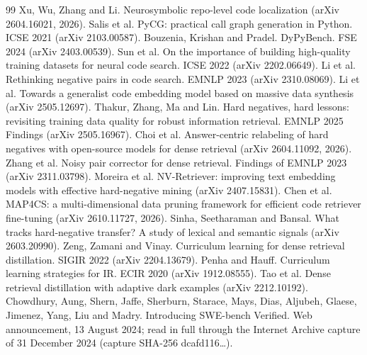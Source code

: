 \documentclass[10pt,twocolumn]{article}
\begin{document}
\begin{thebibliography}{99}
Xu, Wu, Zhang and Li. Neurosymbolic repo-level code localization (arXiv 2604.16021, 2026).
Salis et al. PyCG: practical call graph generation in Python. ICSE 2021 (arXiv 2103.00587).
Bouzenia, Krishan and Pradel. DyPyBench. FSE 2024 (arXiv 2403.00539).
Sun et al. On the importance of building high-quality training datasets for neural code search. ICSE 2022 (arXiv 2202.06649).
Li et al. Rethinking negative pairs in code search. EMNLP 2023 (arXiv 2310.08069).
Li et al. Towards a generalist code embedding model based on massive data synthesis (arXiv 2505.12697).
Thakur, Zhang, Ma and Lin. Hard negatives, hard lessons: revisiting training data quality for robust information retrieval. EMNLP 2025 Findings (arXiv 2505.16967).
Choi et al. Answer-centric relabeling of hard negatives with open-source models for dense retrieval (arXiv 2604.11092, 2026).
Zhang et al. Noisy pair corrector for dense retrieval. Findings of EMNLP 2023 (arXiv 2311.03798).
Moreira et al. NV-Retriever: improving text embedding models with effective hard-negative mining (arXiv 2407.15831).
Chen et al. MAP4CS: a multi-dimensional data pruning framework for efficient code retriever fine-tuning (arXiv 2610.11727, 2026).
Sinha, Seetharaman and Bansal. What tracks hard-negative transfer? A study of lexical and semantic signals (arXiv 2603.20990).
Zeng, Zamani and Vinay. Curriculum learning for dense retrieval distillation. SIGIR 2022 (arXiv 2204.13679).
Penha and Hauff. Curriculum learning strategies for IR. ECIR 2020 (arXiv 1912.08555).
Tao et al. Dense retrieval distillation with adaptive dark examples (arXiv 2212.10192).
Chowdhury, Aung, Shern, Jaffe, Sherburn, Starace, Mays, Dias, Aljubeh, Glaese, Jimenez, Yang, Liu and Madry. Introducing SWE-bench Verified. Web announcement, 13 August 2024; read in full through the Internet Archive capture of 31 December 2024 (capture SHA-256 dcafd116\ldots{}).

\end{thebibliography}
\end{document}
